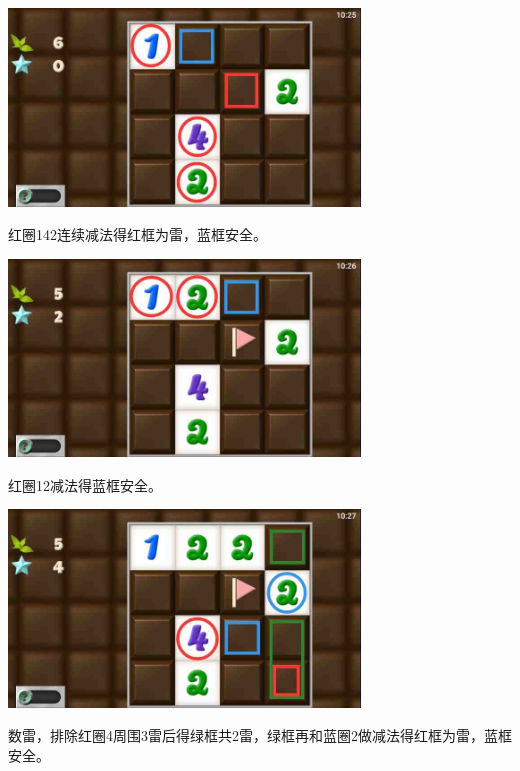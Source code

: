 \subsection{} %
\begin{center}
    \includegraphics[width=0.7\textwidth]{puzzlelow/177-1.jpg}
\end{center}
红圈142连续减法得红框为雷，蓝框安全。
\begin{center}
    \includegraphics[width=0.7\textwidth]{puzzlelow/177-2.jpg}
\end{center}
红圈12减法得蓝框安全。
\begin{center}
    \includegraphics[width=0.7\textwidth]{puzzlelow/177-3.jpg}
\end{center}
数雷，排除红圈4周围3雷后得绿框共2雷，绿框再和蓝圈2做减法得红框为雷，蓝框安全。

